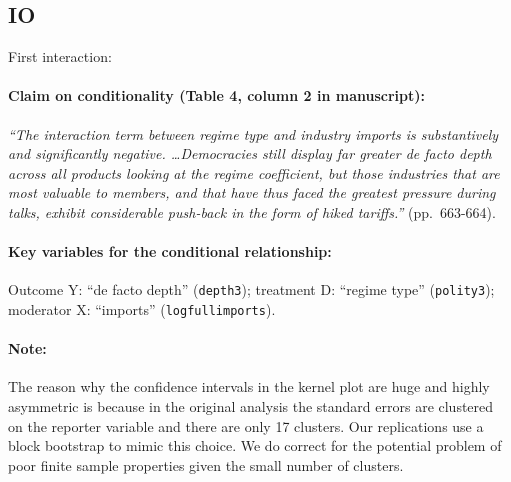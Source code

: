 \documentclass[12pt]{article}
\begin{document}
\clearpage







\subsection{\citet{Pelc2011} IO} \label{pelc}

\noindent First interaction:

\paragraph{Claim on conditionality (Table 4, column 2 in manuscript):} \emph{``The interaction term between regime type and industry imports is substantively and significantly negative.
\ldots Democracies still display far greater de facto depth across all products looking at the regime coefficient, but those industries that are most valuable to members, and that have thus faced the greatest pressure during talks, exhibit considerable push-back in the form of hiked tariffs.''} (pp.\ 663-664). 



\paragraph{Key variables for the conditional relationship:} Outcome Y:
``de facto depth'' (\texttt{depth3}); treatment D: ``regime type'' (\texttt{polity3}); moderator X: ``imports''
(\texttt{logfullimports}).

\paragraph{Note:} The reason why the confidence intervals in the
kernel plot are huge and highly asymmetric is because in the original analysis the standard errors are clustered on the reporter variable and there are
only 17 clusters. Our replications use a block bootstrap to mimic this
choice. We do correct for the potential problem of poor finite sample
properties given the small number of clusters.



\newpage
\end{document}
